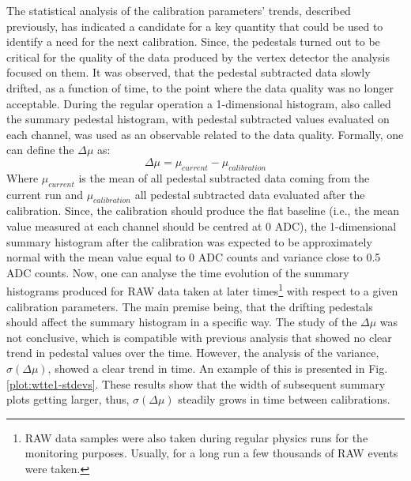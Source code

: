 The statistical analysis of the calibration parameters' trends, described previously, has indicated a candidate for a key quantity that could be used to identify a need for the next calibration. Since, the pedestals turned out to be critical for the quality of the data produced by the vertex detector the analysis focused on them. It was observed, that the pedestal subtracted data slowly drifted, as a function of time, to the point where the data quality was no longer acceptable. During the regular operation a 1-dimensional histogram, also called the summary pedestal histogram, with pedestal subtracted values evaluated on each channel, was used as an observable related to the data quality. Formally, one can define the $\Delta\mu$ as:
\begin{equation}
    \Delta\mu = \mu_{current} - \mu_{calibration}
\end{equation}
Where $\mu_{current}$ is the mean of all pedestal subtracted data coming from the current run and $\mu_{calibration}$ all pedestal subtracted data evaluated after the calibration. 
Since, the calibration should produce the flat baseline (i.e., the mean value measured at each channel should be centred at 0 ADC), the 1-dimensional summary histogram after the calibration was expected to be approximately normal with the mean value equal to 0 ADC counts and variance close to 0.5 ADC counts.
Now, one can analyse the time evolution of the summary histograms produced for RAW data taken at later times\footnote{RAW data samples were also taken during regular physics runs for the monitoring purposes. 
Usually, for a long run a few thousands of RAW events were taken.} with respect to a given calibration parameters. 
The main premise being, that the drifting pedestals should affect the summary histogram in a specific way. 
The study of the $\Delta\mu$ was not conclusive, which is compatible with previous analysis that showed no clear trend in pedestal values over the time.
However, the analysis of the variance, $\sigma(\Delta\mu)$, showed a clear trend in time. An example of this is presented in Fig.
\ref{plot:wtte1-stdevs}. These results show that the width of subsequent summary plots getting larger, thus, $\sigma(\Delta\mu)$ steadily grows in time between calibrations.

